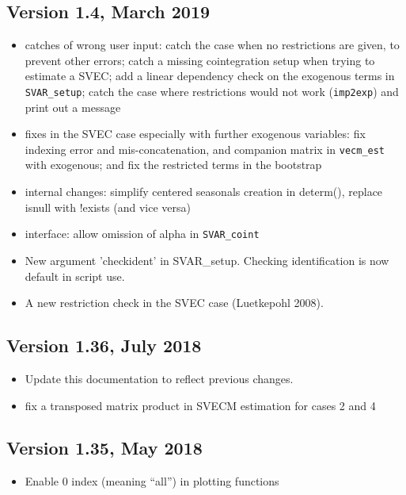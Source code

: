 \documentclass[a4paper,10pt]{article}
\newcounter{script}[section]
\begin{document}
\subsection*{Version 1.4, March 2019}
\begin{itemize}

\item catches of wrong user input: catch the case when no restrictions are given, 
to prevent other errors; catch a missing cointegration setup when trying to 
estimate a SVEC; add a linear dependency check on the exogenous terms 
in \texttt{SVAR\_setup}; catch the case where restrictions would not work 
(\texttt{imp2exp}) and print out a message

\item fixes in the SVEC case especially with further exogenous variables: 
fix indexing error and mis-concatenation, and companion matrix in \texttt{vecm\_est} 
with exogenous; and fix the restricted terms in the bootstrap
 
\item internal changes: simplify centered seasonals creation in determ(),
replace isnull with !exists (and vice versa)

\item interface: allow omission of alpha in \texttt{SVAR\_coint}

\item New argument 'checkident' in SVAR\_setup. Checking identification is now default 
  in script use.

\item A new restriction check in the SVEC case (Luetkepohl 2008).

\end{itemize}

\subsection*{Version 1.36,  July 2018}
\begin{itemize}
\item Update this documentation to reflect previous changes.

\item fix a transposed matrix product in SVECM estimation for cases 2
  and 4
\end{itemize}

\subsection*{Version 1.35,  May 2018}
\begin{itemize}
\item Enable 0 index (meaning ``all'') in plotting functions
\end{itemize}
\end{document}
